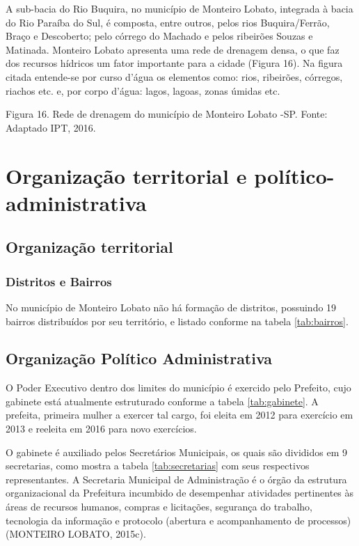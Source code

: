 A sub-bacia do Rio Buquira, no município de Monteiro Lobato, integrada à bacia do Rio Paraíba do Sul, é composta, entre outros, pelos rios Buquira/Ferrão, Braço e Descoberto; pelo córrego do Machado e pelos ribeirões Souzas e Matinada. Monteiro Lobato apresenta uma rede de drenagem densa, o que faz dos recursos hídricos um fator importante para a cidade (Figura 16). Na figura citada entende-se por curso d’água os elementos como: rios, ribeirões, córregos, riachos etc. e, por corpo d’água:  lagos, lagoas, zonas úmidas etc. 


 
Figura 16. Rede de drenagem do município de Monteiro Lobato -SP.
Fonte: Adaptado IPT, 2016.

\section{Organização territorial e político-administrativa}
\subsection{Organização territorial}
\subsubsection{Distritos e Bairros}

No município de Monteiro Lobato não há formação de distritos, possuindo 19 bairros distribuídos por seu território, e listado conforme na tabela \autoref{tab:bairros}.

	

\subsection{Organização Político Administrativa}
O Poder Executivo dentro dos limites do município é exercido pelo Prefeito, cujo gabinete está atualmente estruturado conforme a tabela \autoref{tab:gabinete}. A prefeita, primeira mulher a exercer tal cargo, foi eleita em 2012 para exercício em 2013 e reeleita em 2016 para novo exercícios.

%	

O gabinete é auxiliado pelos Secretários Municipais, os quais são divididos em 9 secretarias, como mostra a tabela \autoref{tab:secretarias} com seus respectivos representantes. A Secretaria Municipal de Administração é o órgão da estrutura organizacional da Prefeitura incumbido de desempenhar atividades pertinentes às áreas de recursos humanos, compras e licitações, segurança do trabalho, tecnologia da informação e protocolo (abertura e acompanhamento de processos) (MONTEIRO LOBATO, 2015c).

